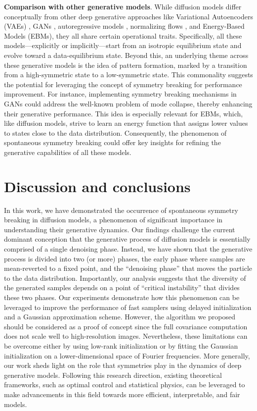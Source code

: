 \documentclass{article}
\begin{document}
\textbf{Comparison with other generative models}. While diffusion models differ conceptually from other deep generative approaches like Variational Autoencoders (VAEs) \citep{kingma2013auto, rezende2014stochastic}, GANs \citep{goodfellow2014generative}, autoregressive models \citep{van2016pixel}, normalizing flows \citep{dinh2014nice, rezende2015variational}, and Energy-Based Models (EBMs), they all share certain operational traits. Specifically, all these models---explicitly or implicitly---start from an isotropic equilibrium state and evolve toward a data-equilibrium state. Beyond this, an underlying theme across these generative models is the idea of pattern formation, marked by a transition from a high-symmetric state to a low-symmetric state. This commonality suggests the potential for leveraging the concept of symmetry breaking for performance improvement. For instance, implementing symmetry breaking mechanisms in GANs could address the well-known problem of mode collapse, thereby enhancing their generative performance. This idea is especially relevant for EBMs, which, like diffusion models, strive to learn an energy function that assigns lower values to states close to the data distribution. Consequently, the phenomenon  of spontaneous symmetry breaking could offer key insights for refining the generative capabilities of all these models. 

 
\section{Discussion and conclusions}
 
In this work, we have demonstrated the occurrence of spontaneous symmetry breaking in diffusion models, a phenomenon of significant importance in understanding their generative dynamics. Our findings challenge the current dominant conception that the generative process of diffusion models is essentially comprised of a single denoising phase. Instead, we have shown that the generative process is divided into two (or more) phases, the early phase where samples are mean-reverted to a fixed point, and the ``denoising phase'' that moves the particle to the data distribution. Importantly, our analysis suggests that the diversity of the generated samples depends on a point of ``critical instability'' that divides these two phases. Our experiments demonstrate how this phenomenon can be leveraged to improve the performance of fast samplers using delayed initialization and a Gaussian approximation scheme. However, the algorithm we proposed should be considered as a proof of concept since the full covariance computation does not scale well to high-resolution images. Nevertheless, these limitations can be overcome either by using low-rank initialization or by fitting the Gaussian initialization on a lower-dimensional space of Fourier frequencies. More generally, our work sheds light on the role that symmetries play in the dynamics of deep generative models. Following this research direction, existing theoretical frameworks, such as optimal control and statistical physics, can be leveraged to make advancements in this field towards more efficient, interpretable, and fair models. 
\end{document}
